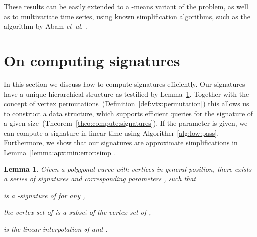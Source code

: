 \documentclass[11pt, letter]{article}
\newcommand{\etal}{\textit{e{}t~a{}l.}\xspace}
\newtheorem{lemma}[theorem]{Lemma}
\newcommand{\seclab}[1]{\label{sec:#1}}
\newcommand{\thmref}[1]{Theorem~\ref{theo:#1}}
\newcommand{\lemlab}[1]{\label{lemma:#1}}
\newcommand{\lemref}[1]{Lemma~\ref{lemma:#1}}
\newcommand{\defref}[1]{Definition~\ref{def:#1}}
\newcommand{\algref}[1]{Algorithm~\ref{alg:#1}}
\begin{document}
These results can be easily extended to a -means variant
of the problem, as well as to multivariate time series, using known
simplification algorithms, such as the algorithm by Abam \etal~\cite{abh-sals-10}. 



\section{On computing signatures}
\seclab{computing:signatures}

In this section we discuss how to compute signatures efficiently. Our signatures have a unique hierarchical structure as testified by \lemref{canonical:signature}.  Together with the concept of vertex permutations~(\defref{vtx:permutation}) this allows us to construct a data structure, which supports efficient queries for the signature of a given size~(\thmref{compute:signatures}).  If the parameter  is given, we can compute a signature in linear time using \algref{low:pass}. Furthermore, we show that our signatures are approximate simplifications in \lemref{apx:min:error:simp}. 


\begin{lemma}\lemlab{canonical:signature}
Given a polygonal curve  with vertices in general position, there exists a
series of signatures  and corresponding parameters
, such that 
\begin{compactenum}[(i)]
\item  is a -signature of  for any , 
\item the vertex set of  is a subset of the vertex set of ,
\item  is the linear interpolation of  and .
\end{compactenum}
\end{lemma}
\end{document}
